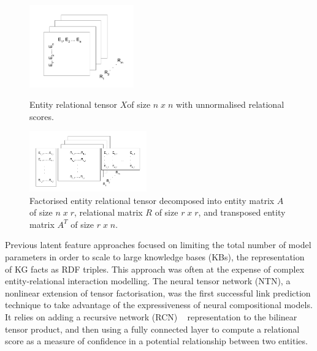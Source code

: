 \begin{figure}[H]
	\parbox{.45\linewidth}{
   		\centering
    		\includegraphics[width=0.4\textwidth, height=0.4\textwidth]{entity_relational_tensor.png}
		\caption{Entity relational tensor $ X $of size $ n \; x \; n $ with unnormalised relational scores.}
	}
	\hfill
	\parbox{.45\linewidth}{
   		\centering
    		\includegraphics[width=0.45\textwidth, height=0.4\textwidth]{factorised_entity_relational_tensor_ARAt.png}
		\caption{Factorised entity relational tensor decomposed into entity matrix $ A $ of size $ n \; x \; r $, relational matrix $ R $ of size $ r \; x \; r $, and transposed entity matrix $ A^T $ of size $ r \; x \; n $.}
	}
\end{figure}

\noindent Previous latent feature approaches focused on limiting the total number of model parameters in order to scale to large knowledge bases (KBs), the representation of KG facts as RDF triples. This approach was often at the expense of complex entity-relational interaction modelling. The neural tensor network (NTN), a nonlinear extension of tensor factorisation, was the first successful link prediction technique to take advantage of the expressiveness of neural compositional models. It relies on adding a recursive network (RCN) \unskip ~\citep{pollack1990recursive} representation to the bilinear tensor product, and then using a fully connected layer to compute a relational score as a measure of confidence in a potential relationship between two entities. \par

